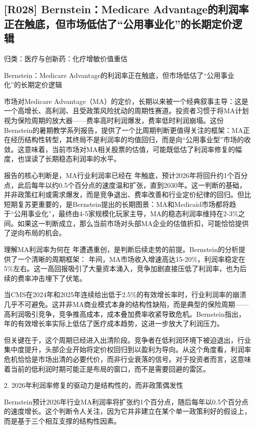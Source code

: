 \documentclass[11pt]{ctexart}
\begin{document}
\subsection{[R028] Bernstein：Medicare Advantage的利润率正在触底，但市场低估了“公用事业化”的长期定价逻辑}
{\small\color{refgray}归类：医疗与创新药：化疗增敏价值重估}

Bernstein：Medicare Advantage的利润率正在触底，但市场低估了“公用事业化”的长期定价逻辑

市场对Medicare Advantage（MA）的定价，长期以来被一个经典叙事主导：这是一个高增长、高利润、且受政策风险扰动的周期性赛道。投资者习惯于将MA计划视为保险周期的放大器——费率高时利润爆发，费率低时利润崩塌。这份Bernstein的暑期教学系列报告，提供了一个比周期判断更值得关注的框架：MA正在经历结构性转型，其终局不是利润率的均值回归，而是向“公用事业型”市场的收敛。这意味着，当前市场对MA相关股票的估值，可能既低估了利润率修复的幅度，也误读了长期稳态利润率的水平。

报告的核心判断是，MA行业利润率已经在 年触底，预计2026年将回升约1个百分点，此后每年以约0.5个百分点的速度温和扩张，直到2030年。这一判断的基础，并非政策红利或需求爆发，而是竞争退出、费率改善和行业定价纪律的回归。但比短期复苏更重要的，是Bernstein提出的长期图景：MA和Medicaid市场都将趋于“公用事业化”，最终由4-5家规模化玩家主导，MA的稳态利润率维持在2-3\%之间。如果这一判断成立，那么当前市场对头部MA企业的估值折扣，可能恰恰提供了逆向布局的机会。

理解MA利润率为何在 年遭遇重创，是判断后续走势的前提。Bernstein的分析提供了一个清晰的周期框架： 年间，MA市场收入增速高达15-20\%，利润率稳定在5\%左右。这一高回报吸引了大量资本涌入，竞争加剧直接压低了利润率，也为后续的费率冲击埋下了伏笔。

当CMS在2024年和2025年连续给出低于2.5\%的有效增长率时，行业利润率的崩溃几乎不可避免。这并非MA商业模式本身的结构性缺陷，而是典型的保险周期——高利润吸引竞争，竞争推高成本，成本叠加费率收紧导致危机。Bernstein指出， 年的有效增长率实际上低估了医疗成本趋势，这进一步放大了利润压力。

但关键在于，这个周期已经进入出清阶段。竞争者在低利润环境下被迫退出，行业集中度提升，头部企业开始将定价权回归到以盈利为导向。从这个角度看，利润率危机恰恰是市场出清的必要代价，而非行业衰落的信号。对于投资者而言，这意味着当前的低利润时期可能正是布局的窗口，而不是需要回避的雷区。

2. 2026年利润率修复的驱动力是结构性的，而非政策偶发性

Bernstein预计2026年行业MA利润率将扩张约1个百分点，随后每年以0.5个百分点的速度增长。这个判断令人关注，因为它并非建立在某个单一政策利好的假设上，而是基于三个相互支撑的结构性因素。
\end{document}
